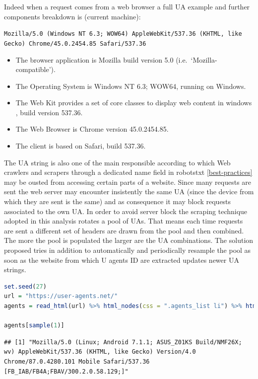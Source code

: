 \documentclass[
  12pt,
  a4paper,
  oneside]{book}
\newcommand{\passthrough}[1]{#1}
\providecommand{\tightlist}{%
  \setlength{\itemsep}{0pt}\setlength{\parskip}{0pt}}
\theoremstyle{definition}
\theoremstyle{definition}
\theoremstyle{definition}
\theoremstyle{remark}
\begin{document}
Indeed when a request comes from a web browser a full UA example and further components breakdown is (current machine):

\passthrough{\lstinline!Mozilla/5.0 (Windows NT 6.3; WOW64) AppleWebKit/537.36 (KHTML, like Gecko) Chrome/45.0.2454.85 Safari/537.36!}

\begin{itemize}
\tightlist
\item
  The browser application is Mozilla build version 5.0 (i.e.~`Mozilla-compatible').
\item
  The Operating System is Windows NT 6.3; WOW64, running on Windows.
\item
  The Web Kit provides a set of core classes to display web content in windows \citep{UserAgen23}, build version 537.36.
\item
  The Web Browser is Chrome version 45.0.2454.85.
\item
  The client is based on Safari, build 537.36.
\end{itemize}

The UA string is also one of the main responsible according to which Web crawlers and scrapers through a dedicated name field in robotstxt \ref{best-practices} may be ousted from accessing certain parts of a website. Since many requests are sent the web server may encounter insistently the same UA (since the device from which they are sent is the same) and as consequence it may block requests associated to the own UA. In order to avoid server block the scraping technique adopted in this analysis rotates a pool of UAs. That means each time requests are sent a different set of headers are drawn from the pool and then combined. The more the pool is populated the larger are the UA combinations. The solution proposed tries in addition to automatically and periodically resample the pool as soon as the website from which U agents ID are extracted updates newer UA strings.

\begin{lstlisting}[language=R]
set.seed(27)
url = "https://user-agents.net/"
agents = read_html(url) %>% html_nodes(css = ".agents_list li") %>% html_text()

agents[sample(1)]
\end{lstlisting}

\begin{lstlisting}
## [1] "Mozilla/5.0 (Linux; Android 7.1.1; ASUS_Z01KS Build/NMF26X; wv) AppleWebKit/537.36 (KHTML, like Gecko) Version/4.0 Chrome/87.0.4280.101 Mobile Safari/537.36 [FB_IAB/FB4A;FBAV/300.2.0.58.129;]"
\end{lstlisting}
\end{document}
